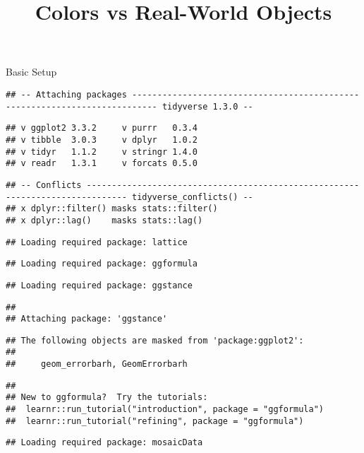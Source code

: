 \documentclass[
]{article}
\title{Colors vs Real-World Objects}
\author{}
\date{\vspace{-2.5em}}
\begin{document}
\maketitle

Basic Setup

\begin{verbatim}
## -- Attaching packages --------------------------------------------------------------------------- tidyverse 1.3.0 --
\end{verbatim}

\begin{verbatim}
## v ggplot2 3.3.2     v purrr   0.3.4
## v tibble  3.0.3     v dplyr   1.0.2
## v tidyr   1.1.2     v stringr 1.4.0
## v readr   1.3.1     v forcats 0.5.0
\end{verbatim}

\begin{verbatim}
## -- Conflicts ------------------------------------------------------------------------------ tidyverse_conflicts() --
## x dplyr::filter() masks stats::filter()
## x dplyr::lag()    masks stats::lag()
\end{verbatim}

\begin{verbatim}
## Loading required package: lattice
\end{verbatim}

\begin{verbatim}
## Loading required package: ggformula
\end{verbatim}

\begin{verbatim}
## Loading required package: ggstance
\end{verbatim}

\begin{verbatim}
## 
## Attaching package: 'ggstance'
\end{verbatim}

\begin{verbatim}
## The following objects are masked from 'package:ggplot2':
## 
##     geom_errorbarh, GeomErrorbarh
\end{verbatim}

\begin{verbatim}
## 
## New to ggformula?  Try the tutorials: 
##  learnr::run_tutorial("introduction", package = "ggformula")
##  learnr::run_tutorial("refining", package = "ggformula")
\end{verbatim}

\begin{verbatim}
## Loading required package: mosaicData
\end{verbatim}
\end{document}

